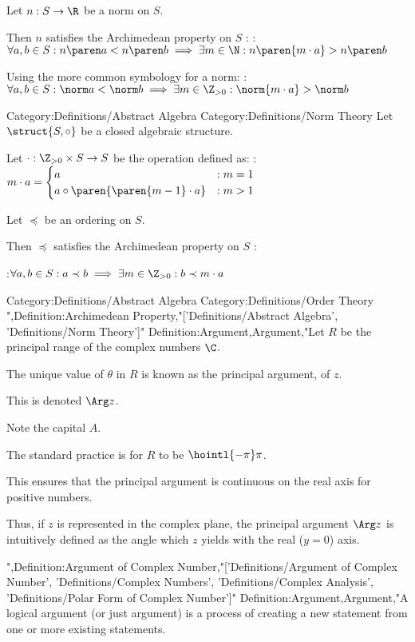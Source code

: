 Let $n: S \to \R$ be a norm on $S$.



Then $n$ satisfies the Archimedean property on $S$ :
:$\forall a, b \in S: n \paren a < n \paren b \implies \exists m \in \N: n \paren {m \cdot a} > n \paren b$


Using the more common symbology for a norm:
:$\forall a, b \in S: \norm a < \norm b \implies \exists m \in \Z_{>0}: \norm {m \cdot a} > \norm b$


Category:Definitions/Abstract Algebra
Category:Definitions/Norm Theory
Let $\struct {S, \circ}$ be a closed algebraic structure.

Let $\cdot: \Z_{>0} \times S \to S$ be the operation defined as:
:$m \cdot a = \begin{cases}
a & : m = 1 \\
a \circ \paren {\paren {m - 1} \cdot a} & : m > 1 \end {cases}$


Let $\preceq$ be an ordering on $S$.


Then $\preceq$ satisfies the Archimedean property on $S$ :

:$\forall a, b \in S: a \prec b \implies \exists m \in \Z_{>0}: b \prec m \cdot a$


Category:Definitions/Abstract Algebra
Category:Definitions/Order Theory
",Definition:Archimedean Property,"['Definitions/Abstract Algebra', 'Definitions/Norm Theory']"
Definition:Argument,Argument,"Let $R$ be the principal range of the complex numbers $\C$.

The unique value of $\theta$ in $R$ is known as the principal argument, of $z$.

This is denoted $\Arg z$.

Note the capital $A$.

The standard practice is for $R$ to be $\hointl {-\pi} \pi$.

This ensures that the principal argument is continuous on the real axis for positive numbers.

Thus, if $z$ is represented in the complex plane, the principal argument $\Arg z$ is intuitively defined as the angle which $z$ yields with the real ($y = 0$) axis.



",Definition:Argument of Complex Number,"['Definitions/Argument of Complex Number', 'Definitions/Complex Numbers', 'Definitions/Complex Analysis', 'Definitions/Polar Form of Complex Number']"
Definition:Argument,Argument,"A logical argument (or just argument) is a process of creating a new statement from one or more existing statements.

